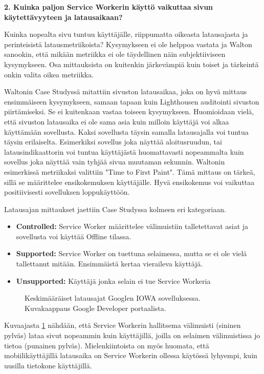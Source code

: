 \documentclass{tktltiki}
\begin{document}
\textbf{2. Kuinka paljon Service Workerin käyttö vaikuttaa sivun käytettävyyteen ja latausaikaan?}

Kuinka nopealta sivu tuntuu käyttäjälle, riippumatta oikeasta latausajasta ja perinteisistä latausmetriikoista? Kysymykseen ei ole helppoa vastata ja Walton sanookin, että mikään metriikka ei ole täydellinen näin subjektiiviseen kysymykseen. Osa mittauksista on kuitenkin järkevämpiä kuin toiset ja tärkeintä onkin valita oikea metriikka.

Waltonin Case Studyssä mitattiin sivuston latausaikaa, joka on hyvä mittaus ensimmäiseen kysymykseen, samaan tapaan kuin Lighthousen auditointi sivuston piirtämiseksi. Se ei kuitenkaan vastaa toiseen kysymykseen. Huomioidaan vielä, että sivuston latausaika ei ole sama asia kuin milloin käyttäjä voi alkaa käyttämään sovellusta. Kaksi sovellusta täysin samalla latausajalla voi tuntua täysin erilaiselta. Esimerkiksi sovellus joka näyttää aloitusruudun, tai latausindikaattorin voi tuntua käyttäjästä huomattavasti nopeammalta kuin sovellus joka näyttää vain tyhjää sivua muutaman sekunnin. Waltonin esimerkissä metriikaksi valittiin "Time to First Paint". Tämä mittaus on tärkeä, sillä se määrittelee ensikokemuksen käyttäjälle. Hyvä ensikokemus voi vaikuttaa positiivisesti sovelluksen loppukäyttöön. 

Latausajan mittaukset jaettiin Case Studyssa kolmeen eri kategoriaan.

\begin{itemize}
  \item \textbf{Controlled:} Service Worker määrittelee välimuistiin talletettavat asiat ja sovellusta voi käyttää Offline tilassa.
  \item \textbf{Supported:} Service Worker on tuettuna selaimessa, mutta se ei ole vielä tallettanut mitään. Ensimmäistä kertaa vieraileva käyttäjä.
  \item \textbf{Unsupported:} Käyttäjä jonka selain ei tue Service Workeria 
\end{itemize}

\begin{figure}[h]
\begin{center}
\caption{Keskimääräiset latausajat Googlen IOWA sovelluksessa. Kuvakaappaus Google Developer portaalista.}
\label{Google AVG load times}
\end{center}
\end{figure}

Kuvaajasta \ref{Google AVG load times} nähdään, että Service Workerin hallitsema välimuisti (sininen pylväs) lataa sivut nopeammin kuin käyttäjillä, joilla on selaimen välimuistissa jo tietoa (punainen pylväs). Mielenkiintoista on myös huomata, että mobiilikäyttäjillä latausaika on Service Workerin ollessa käytössä lyhyempi, kuin uusilla tietokone käyttäjillä. 
\end{document}
